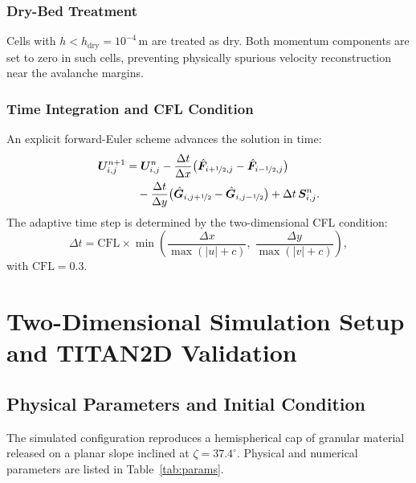 \documentclass[10pt, conference]{FMFP2023}
\begin{document}
\subsubsection{Dry-Bed Treatment}

Cells with $h<h_{\text{dry}}=10^{-4}$\,m are treated as dry.
Both momentum components are set to zero in such cells, preventing
physically spurious velocity reconstruction near the avalanche margins.

\subsubsection{Time Integration and CFL Condition}

An explicit forward-Euler scheme advances the solution in time:
\begin{equation}
\begin{aligned}
    \bm{U}^{n+1}_{i,j} &= \bm{U}^n_{i,j}
    - \frac{\Delta t}{\Delta x}
      \bigl(\hat{\bm{F}}_{i+\nicefrac{1}{2},j}
           -\hat{\bm{F}}_{i-\nicefrac{1}{2},j}\bigr) \\
    &\quad
    - \frac{\Delta t}{\Delta y}
      \bigl(\hat{\bm{G}}_{i,j+\nicefrac{1}{2}}
           -\hat{\bm{G}}_{i,j-\nicefrac{1}{2}}\bigr)
    + \Delta t\,\bm{S}^n_{i,j}.
\end{aligned}
    \label{eq:fv_update}
\end{equation}
The adaptive time step is determined by the two-dimensional CFL
condition:
\begin{equation}
    \Delta t = \text{CFL} \times \min\!\left(
    \frac{\Delta x}{\max(|u|+c)},\;
    \frac{\Delta y}{\max(|v|+c)}\right),
    \label{eq:cfl_2d}
\end{equation}
with $\text{CFL}=0.3$.

\section{Two-Dimensional Simulation Setup and TITAN2D Validation}

\subsection{Physical Parameters and Initial Condition}

The simulated configuration reproduces a hemispherical cap of granular
material released on a planar slope inclined at $\zeta=37.4^\circ$.
Physical and numerical parameters are listed in
Table~\ref{tab:params}.
\end{document}
